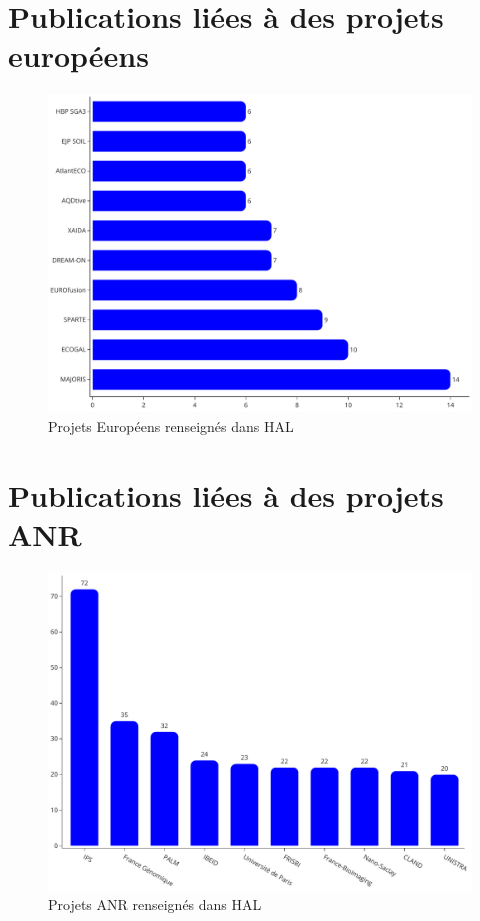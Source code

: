 \documentclass[french, 11pt]{dibiso/biso}
\begin{document}






\pagebreak

\section{Publications liées à des projets européens}

\begin{figure}[!h]
  \includegraphics[width=.8\textwidth]{figures/european_projects.pdf}
  \centering
  \caption{Projets Européens renseignés dans HAL}
  \label{fig_eu_projects}
\end{figure}


\section{Publications liées à des projets ANR}

\begin{figure}[!h]
  \includegraphics[width=.8\textwidth]{figures/anr_projects.pdf}
  \centering
  \caption{Projets ANR renseignés dans HAL}
  \label{fig_anr_projects}
\end{figure}
\end{document}
